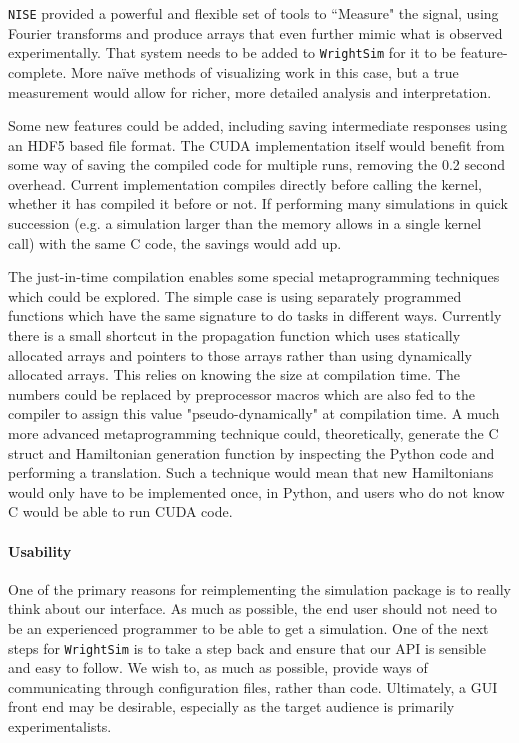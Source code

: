 \texttt{NISE} provided a powerful and flexible set of tools to
``Measure" the signal, using Fourier transforms and produce arrays that
even further mimic what is observed experimentally. That system needs to
be added to \texttt{WrightSim} for it to be feature-complete. More naïve
methods of visualizing work in this case, but a true measurement would
allow for richer, more detailed analysis and interpretation.

Some new features could be added, including saving intermediate
responses using an HDF5 based file format. The CUDA implementation
itself would benefit from some way of saving the compiled code for
multiple runs, removing the 0.2 second overhead. Current implementation
compiles directly before calling the kernel, whether it has compiled it
before or not. If performing many simulations in quick succession (e.g.
a simulation larger than the memory allows in a single kernel call) with
the same C code, the savings would add up.

The just-in-time compilation enables some special metaprogramming
techniques which could be explored. The simple case is using separately
programmed functions which have the same signature to do tasks in
different ways. Currently there is a small shortcut in the propagation
function which uses statically allocated arrays and pointers to those
arrays rather than using dynamically allocated arrays. This relies on
knowing the size at compilation time. The numbers could be replaced by
preprocessor macros which are also fed to the compiler to assign this
value "pseudo-dynamically" at compilation time. A much more advanced
metaprogramming technique could, theoretically, generate the C struct
and Hamiltonian generation function by inspecting the Python code and
performing a translation. Such a technique would mean that new
Hamiltonians would only have to be implemented once, in Python, and
users who do not know C would be able to run CUDA code.

\hypertarget{usability}{%
\paragraph{Usability}\label{usability}}

One of the primary reasons for reimplementing the simulation package is
to really think about our interface. As much as possible, the end user
should not need to be an experienced programmer to be able to get a
simulation. One of the next steps for \texttt{WrightSim} is to take a
step back and ensure that our API is sensible and easy to follow. We
wish to, as much as possible, provide ways of communicating through
configuration files, rather than code. Ultimately, a GUI front end may
be desirable, especially as the target audience is primarily
experimentalists.

